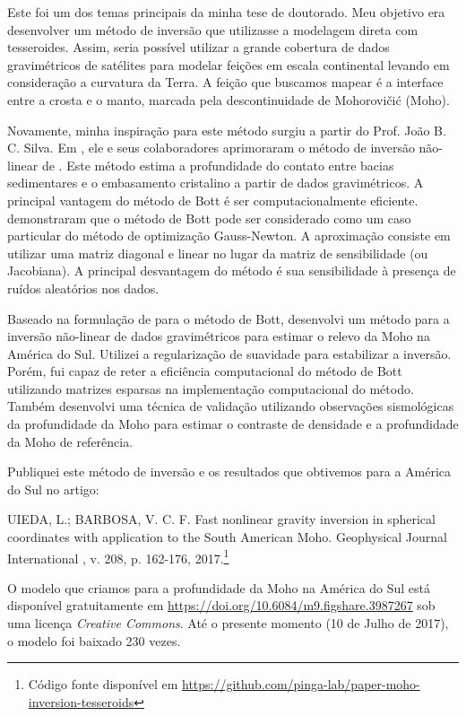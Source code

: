Este foi um dos temas principais da minha tese de doutorado.
Meu objetivo era desenvolver um método de inversão que utilizasse a modelagem
direta com tesseroides.
Assim, seria possível utilizar a grande cobertura de dados gravimétricos de
satélites para modelar feições em escala continental levando em
consideração a curvatura da Terra.
A feição que buscamos mapear é a interface entre a crosta e o manto, marcada
pela descontinuidade de Mohorovičić (Moho).

Novamente, minha inspiração para este método surgiu a partir do Prof. João B.
C. Silva.
Em \citet{silva2014}, ele e seus colaboradores aprimoraram o método de
inversão não-linear de \citet{bott}.
Este método estima a profundidade do contato entre bacias sedimentares e o
embasamento cristalino a partir de dados gravimétricos.
A principal vantagem do método de Bott é ser computacionalmente eficiente.
\citet{silva2014} demonstraram que o método de Bott pode ser considerado como
um caso particular do método de optimização Gauss-Newton.
A aproximação consiste em utilizar uma matriz diagonal e linear no lugar da
matriz de sensibilidade (ou Jacobiana).
A principal desvantagem do método é sua sensibilidade à presença de ruídos
aleatórios nos dados.

Baseado na formulação de \citet{silva2014} para o método de Bott, desenvolvi um
método para a inversão não-linear de dados gravimétricos para estimar o relevo
da Moho na América do Sul.
Utilizei a regularização de suavidade para estabilizar a inversão.
Porém, fui capaz de reter a eficiência computacional do método de Bott
utilizando matrizes esparsas na implementação computacional do método.
Também desenvolvi uma técnica de validação utilizando observações sismológicas
da profundidade da Moho para estimar o contraste de densidade e a profundidade
da Moho de referência.

Publiquei este método de inversão e os resultados que obtivemos para a América
do Sul no artigo:

\begin{displayquote}
    UIEDA, L.; BARBOSA, V. C. F. Fast nonlinear gravity inversion in spherical
    coordinates with application to the South American Moho. Geophysical
    Journal International , v. 208, p. 162-176, 2017.\footnote{Código fonte
    disponível em
    \url{https://github.com/pinga-lab/paper-moho-inversion-tesseroids}}
\end{displayquote}

O modelo que criamos para a profundidade da Moho na América do Sul está
disponível gratuitamente em \url{https://doi.org/10.6084/m9.figshare.3987267}
sob uma licença \textit{Creative Commons}.
Até o presente momento (10 de Julho de 2017), o modelo foi
baixado 230 vezes.


